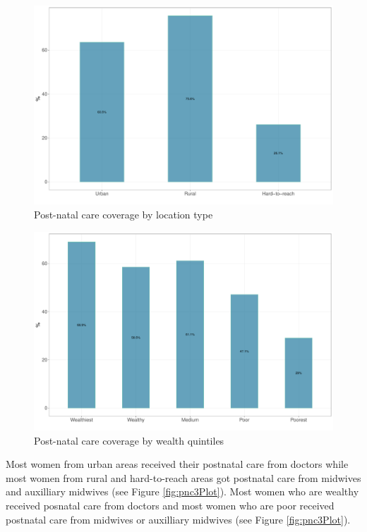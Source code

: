 \documentclass[12pt,a4paper]{article}
\begin{document}
\begin{figure}[H]

{\centering \includegraphics{kayahReport_files/figure-latex/pnc1Plot-1} 

}

\caption{Post-natal care coverage by location type}\label{fig:pnc1Plot}
\end{figure}

\begin{figure}[H]

{\centering \includegraphics{kayahReport_files/figure-latex/pnc2Plot-1} 

}

\caption{Post-natal care coverage by wealth quintiles}\label{fig:pnc2Plot}
\end{figure}

Most women from urban areas received their postnatal care from doctors while most women from rural and hard-to-reach areas got postnatal care from midwives and auxilliary midwives (see Figure \ref{fig:pnc3Plot}). Most women who are wealthy received posnatal care from doctors and most women who are poor received postnatal care from midwives or auxilliary midwives (see Figure \ref{fig:pnc3Plot}).
\end{document}
